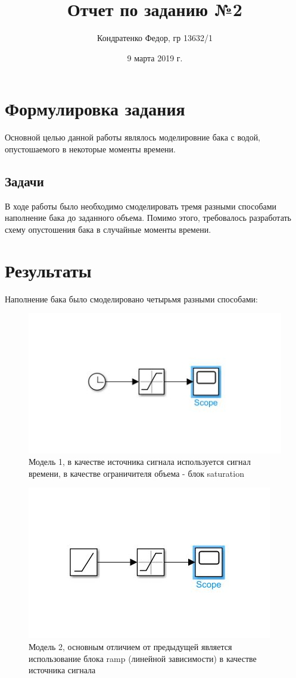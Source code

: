 \documentclass{article}
\date{9 марта 2019 г.}
\author{Кондратенко Федор, гр 13632/1}
\title{Отчет по заданию №2}
\begin{document}
	\maketitle
	\section{Формулировка задания}
	Основной целью данной работы являлось моделировние бака с водой, опустошаемого в некоторые моменты времени.
	\subsection{Задачи}
	В ходе работы было необходимо смоделировать тремя разными способами наполнение бака до заданного объема. Помимо этого, требовалось разработать схему опустошения бака в случайные моменты времени.
	\section{Результаты}
	Наполнение бака было смоделировано четырьмя разными способами:
	\begin{figure}[H]
		\centering
		\includegraphics[width=0.7\linewidth]{model1}
		\caption{Модель 1, в качестве источника сигнала используется сигнал времени, в качестве ограничителя объема - блок saturation}
	\end{figure}
	\begin{figure}[H]
		\centering
		\includegraphics[width=0.7\linewidth]{model2}
		\caption{Модель 2, основным отличием от предыдущей является использование блока ramp (линейной зависимости) в качестве источника сигнала}
	\end{figure}
\end{document}

